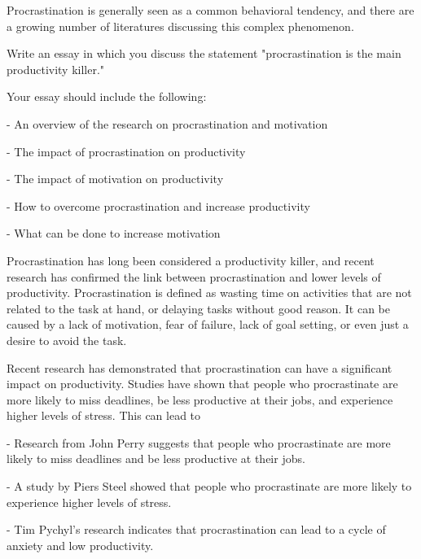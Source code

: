 Procrastination is generally seen as a common behavioral tendency, and there are a growing number of literatures discussing this complex phenomenon.


Write an essay in which you discuss the statement "procrastination is the main productivity killer."


Your essay should include the following:

- An overview of the research on procrastination and motivation

- The impact of procrastination on productivity

- The impact of motivation on productivity

- How to overcome procrastination and increase productivity

- What can be done to increase motivation


Procrastination has long been considered a productivity killer, and recent research has confirmed the link between procrastination and lower levels of productivity. Procrastination is defined as wasting time on activities that are not related to the task at hand, or delaying tasks without good reason. It can be caused by a lack of motivation, fear of failure, lack of goal setting, or even just a desire to avoid the task.


Recent research has demonstrated that procrastination can have a significant impact on productivity. Studies have shown that people who procrastinate are more likely to miss deadlines, be less productive at their jobs, and experience higher levels of stress. This can lead to


- Research from John Perry suggests that people who procrastinate are more likely to miss deadlines and be less productive at their jobs.


- A study by Piers Steel showed that people who procrastinate are more likely to experience higher levels of stress.

- Tim Pychyl's research indicates that procrastination can lead to a cycle of anxiety and low productivity.




